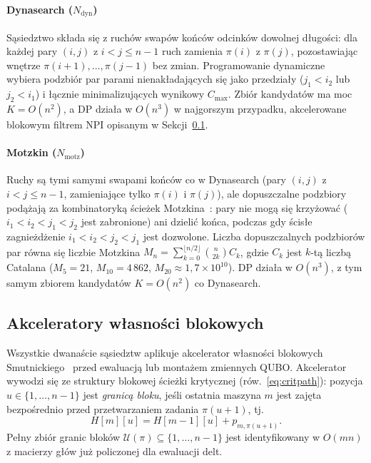 \documentclass[11pt,a4paper]{article}
\begin{document}
\paragraph{Dynasearch \textup{($N_{\mathrm{dyn}}$)}}
Sąsiedztwo składa się z ruchów swapów końców odcinków dowolnej
długości: dla każdej pary $(i,j)$ z $i<j\le n-1$ ruch zamienia $\pi(i)$
z $\pi(j)$, pozostawiając wnętrze $\pi(i+1),\ldots,\pi(j-1)$ bez zmian.
Programowanie dynamiczne~\citep{congram02} wybiera podzbiór par parami
nienakładających się jako przedziały ($j_1<i_2$ lub $j_2<i_1$)
i łącznie minimalizujących wynikowy $C_{\max}$. Zbiór kandydatów ma moc
$K=O(n^2)$, a DP działa w $O(n^3)$ w najgorszym przypadku, akcelerowane
blokowym filtrem NPI opisanym w Sekcji~\ref{sec:accelerators}.

\paragraph{Motzkin \textup{($N_{\mathrm{motz}}$)}}
Ruchy są tymi samymi swapami końców co w Dynasearch (pary $(i,j)$
z $i<j\le n-1$, zamieniające tylko $\pi(i)$ i $\pi(j)$), ale
dopuszczalne podzbiory podążają za kombinatoryką ścieżek
Motzkina~\citep{motzkin1948,Motzkin_PWR,Motzkin_PWR_EXIT}: pary nie
mogą się krzyżować ($i_1<i_2<j_1<j_2$ jest zabronione) ani dzielić
końca, podczas gdy ścisłe zagnieżdżenie $i_1<i_2<j_2<j_1$ jest
dozwolone. Liczba dopuszczalnych podzbiorów par równa się liczbie
Motzkina $M_n=\sum_{k=0}^{\lfloor n/2\rfloor}\binom{n}{2k}C_k$, gdzie
$C_k$ jest $k$-tą liczbą Catalana ($M_5=21$, $M_{10}=4\,862$,
$M_{20}\approx1{,}7\times10^{10}$). DP działa w $O(n^3)$, z tym samym
zbiorem kandydatów $K=O(n^2)$ co Dynasearch.

\subsection{Akceleratory własności blokowych}
\label{sec:accelerators}

Wszystkie dwanaście sąsiedztw aplikuje akcelerator własności blokowych
Smutnickiego~\citep{ref_smutnicki} przed ewaluacją lub montażem
zmiennych QUBO. Akcelerator wywodzi się ze struktury blokowej ścieżki
krytycznej (rów.~\eqref{eq:critpath}): pozycja $u\in\{1,\ldots,n-1\}$
jest \emph{granicą bloku}, jeśli ostatnia maszyna $m$ jest zajęta
bezpośrednio przed przetwarzaniem zadania $\pi(u+1)$, tj.
\begin{equation}
  H[m][u] = H[m-1][u] + p_{m,\pi(u+1)}.
  \label{eq:boundary}
\end{equation}
Pełny zbiór granic bloków
$\mathcal U(\pi)\subseteq\{1,\ldots,n-1\}$ jest identyfikowany
w $O(mn)$ z macierzy głów już policzonej dla ewaluacji delt.
\end{document}

